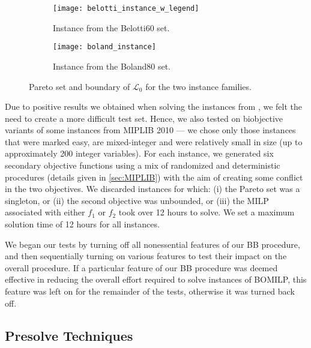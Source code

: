 \documentclass[11.5pt]{article}
\renewcommand{\L}{\mathcal{L}}
\begin{document}
\begin{figure}[h!]
\begin{subfigure}[h]{.55\textwidth}
\centering
\texttt{[image: belotti\_instance\_w\_legend]}
\caption{Instance from the Belotti60 set.}
\label{belotti_instance}
\end{subfigure}%
\begin{subfigure}[h]{.45\textwidth}
\centering
\texttt{[image: boland\_instance]}
\caption{Instance from the Boland80 set.}
\label{boland_instance}
\end{subfigure}
\caption{Pareto set and boundary of $\L_0$ for the two instance families.}%
\label{pareto_sets}
\end{figure}

Due to positive results we obtained when solving the instances from \citep{belotti2012biobjective,boland2015acriterion}, we felt the need to create a more difficult test set. Hence, we also tested on biobjective variants of some instances from MIPLIB 2010 \citep{koch2011miplib} --- we chose only those instances that were marked easy, are mixed-integer and were relatively small in size (up to approximately 200 integer variables). For each instance, we generated six secondary objective functions using a mix of randomized and deterministic procedures (details given in \textsection\ref{sec:MIPLIB}) with the aim of creating some conflict in the two objectives. We discarded instances for which: (i) the Pareto set was a singleton, or (ii) the second objective was unbounded, or (iii) the MILP associated with either $f_1$ or $f_2$ took over 12 hours to solve. We set a maximum solution time of 12 hours for all instances.

We began our tests by turning off all nonessential features of our BB procedure, and then sequentially turning on various features to test their impact on the overall procedure. If a particular feature of our BB procedure was deemed effective in reducing the overall effort required to solve instances of BOMILP, this feature was left on for the remainder of the tests, otherwise it was turned back off. %

\subsection{Presolve Techniques}
\end{document}
